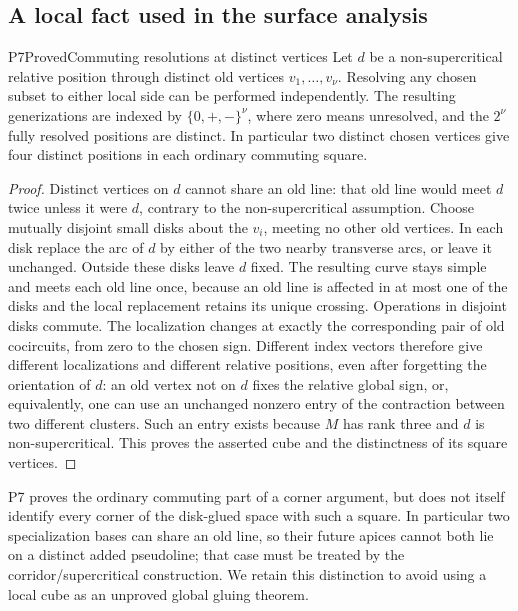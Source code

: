 \subsection{A local fact used in the surface analysis}

\begin{resultenv}{P7}{Proved}{Commuting resolutions at distinct vertices}
Let $d$ be a non-supercritical relative position through distinct old
vertices $v_1,\ldots,v_\nu$.  Resolving any chosen subset to either
local side can be performed independently.  The resulting
generizations are indexed by $\{0,+,-\}^{\nu}$, where zero means
unresolved, and the $2^\nu$ fully resolved positions are distinct.
In particular two distinct chosen vertices give four distinct
positions in each ordinary commuting square.
\end{resultenv}

\begin{proof}
Distinct vertices on $d$ cannot share an old line: that old line
would meet $d$ twice unless it were $d$, contrary to the
non-supercritical assumption.  Choose mutually disjoint small disks
about the $v_i$, meeting no other old vertices.  In each disk replace
the arc of $d$ by either of the two nearby transverse arcs, or leave
it unchanged.  Outside these disks leave $d$ fixed.  The resulting
curve stays simple and meets each old line once, because an old line
is affected in at most one of the disks and the local replacement
retains its unique crossing.  Operations in disjoint disks commute.
The localization changes at exactly the corresponding pair of old
cocircuits, from zero to the chosen sign.  Different index vectors
therefore give different localizations and different relative
positions, even after forgetting the orientation of $d$: an old
vertex not on $d$ fixes the relative global sign, or, equivalently,
one can use an unchanged nonzero entry of the contraction between two
different clusters.  Such an entry exists because $M$ has rank three
and $d$ is non-supercritical.  This proves the asserted cube and the
distinctness of its square vertices.
\end{proof}

P7 proves the ordinary commuting part of a corner argument, but does
not itself identify every corner of the disk-glued space with such a
square.  In particular two specialization bases can share an old
line, so their future apices cannot both lie on a distinct added
pseudoline; that case must be treated by the corridor/supercritical
construction.  We retain this distinction to avoid using a local
cube as an unproved global gluing theorem.


